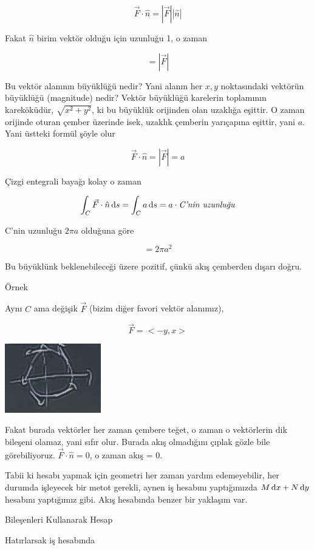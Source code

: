 \documentclass[12pt,fleqn]{article}\usepackage{../../common}
\begin{document}
$$ \vec{F} \cdot \hat{n} = |\vec{F}||\hat{n}| $$

Fakat $\hat{n}$ birim vektör olduğu için uzunluğu 1, o zaman

$$  = |\vec{F}| $$

Bu vektör alanının büyüklüğü nedir? Yani alanın her $x,y$ noktasındaki
vektörün büyüklüğü (magnitude) nedir? Vektör büyüklüğü karelerin toplamının
kareköküdür, $\sqrt{x^2 + y^2}$, ki bu büyüklük orijinden olan uzaklığa
eşittir. O zaman orijinde oturan çember üzerinde isek, uzaklık çemberin
yarıçapına eşittir, yani $a$. Yani üstteki formül şöyle olur

$$ \vec{F} \cdot \hat{n} = |\vec{F}| = a$$

Çizgi entegrali bayağı kolay o zaman

$$ \int_C \vec{F} \cdot \hat{n} \,\mathrm{d} s 
= \int_C a \,\mathrm{d} s  = a \cdot \textit{C'nin uzunluğu}
$$

C'nin uzunluğu $2\pi a$ olduğuna göre

$$ = 2\pi a^2 $$

Bu büyüklünk beklenebileceği üzere pozitif, çünkü akış çemberden dışarı
doğru. 

Örnek

Aynı $C$ ama değişik $\vec{F}$ (bizim diğer favori vektör alanımız), 

$$ \vec{F} = < -y,x > $$

\begin{center}

\includegraphics[height=3cm]{23_7.png}

\end{center}
Fakat burada vektörler her zaman çembere teğet, o zaman o vektörlerin dik
bileşeni olamaz, yani sıfır olur. Burada akış olmadığını çıplak gözle bile
görebiliyoruz. $\vec{F} \cdot \hat{n} = 0$, o zaman akış = 0. 

Tabii ki hesabı yapmak için geometri her zaman yardım edemeyebilir, her durumda
işleyecek bir metot gerekli, aynen iş hesabını yaptığımızda $M \,\mathrm{d} x + N \,\mathrm{d} y$
hesabını yaptığımız gibi. Akış hesabında benzer bir yaklaşım var.

Bileşenleri Kullanarak Hesap

Hatırlarsak iş hesabında 
\end{document}
